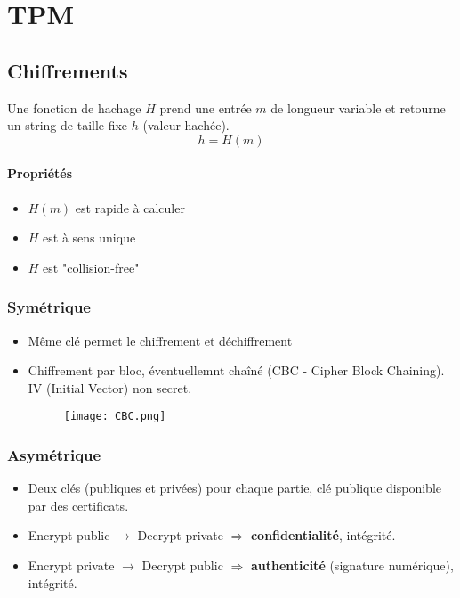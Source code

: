 \section{TPM}
\subsection{Chiffrements}
Une fonction de hachage $H$ prend une entrée $m$ de longueur variable et retourne un string de taille fixe $h$ (valeur hachée).
$$h=H(m)$$
\paragraph{Propriétés}
\begin{itemize}
    \item $H(m)$ est rapide à calculer
    \item $H$ est à sens unique
    \item $H$ est "collision-free"
\end{itemize}
\subsubsection{Symétrique}
\begin{itemize}
    \item Même clé permet le chiffrement et déchiffrement
    \item Chiffrement par bloc, éventuellemnt chaîné (CBC - Cipher Block Chaining). IV (Initial Vector) non secret.
    \begin{figure}[H]
        \centering
        \texttt{[image: CBC.png]}
    \end{figure}
\end{itemize}
\subsubsection{Asymétrique}
\begin{itemize}
    \item Deux clés (publiques et privées) pour chaque partie, clé publique disponible par des certificats.
    \item Encrypt public $\rightarrow$ Decrypt private $\Rightarrow$ \textbf{confidentialité}, intégrité.
    \item Encrypt private $\rightarrow$ Decrypt public $\Rightarrow$ \textbf{authenticité} (signature numérique), intégrité.
\end{itemize}

